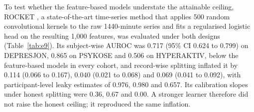 To test whether the feature-based models understate the attainable ceiling, ROCKET \cite{dempster2020}, a state-of-the-art time-series method that applies 500 random convolutional kernels to the raw 1440-minute series and fits a regularised logistic head on the resulting 1{,}000 features, was evaluated under both designs (Table~\ref{tab:e9}). Its subject-wise AUROC was 0.717 (95\% CI 0.624 to 0.799) on DEPRESJON, 0.865 on PSYKOSE and 0.506 on HYPERAKTIV, below the feature-based models in every cohort, and record-wise splitting inflated it by 0.114 (0.066 to 0.167), 0.040 (0.021 to 0.068) and 0.069 (0.041 to 0.092), with participant-level leaky estimates of 0.976, 0.980 and 0.657. Its calibration slopes under honest splitting were 0.36, 0.67 and 0.00. A stronger learner therefore did not raise the honest ceiling; it reproduced the same inflation.
